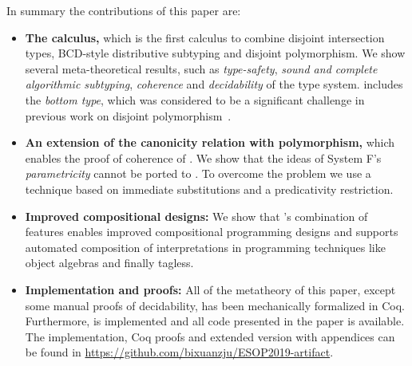 \begin{comment}
Besides coherence, we show
several other important meta-theoretical results, such as type-safety, 
sound and complete algorithmic subtyping, and
decidability of the type system. Remarkably, unlike 
\fsub's \emph{bounded polymorphism}, disjoint polymorphism
in \fnamee supports decidable type-checking.
\end{comment}

In summary the contributions of this paper are:
\begin{itemize}

\item {\bf The \fnamee calculus,} which is the first calculus to combine 
disjoint intersection types, BCD-style distributive subtyping and 
disjoint polymorphism. We show several meta-theoretical results, such as \emph{type-safety}, \emph{sound and complete algorithmic subtyping},
\emph{coherence} and \emph{decidability} of the type system.
\fnamee includes the \emph{bottom type}, which was considered to be a
significant challenge in previous work on disjoint polymorphism~\cite{alpuimdisjoint}.

\item {\bf An extension of the canonicity relation with polymorphism,}
  which enables the proof of coherence of \fnamee. We show that the ideas of
  System F's \emph{parametricity} cannot be ported to
  \fnamee. To overcome the problem we use a technique based on
  immediate substitutions and a predicativity restriction.


\item {\bf Improved compositional designs:} We show that \fnamee's combination of features
enables improved
compositional programming designs and supports automated composition
of interpretations in programming techniques like object algebras and
finally tagless.

\item {\bf Implementation and proofs:} All of the metatheory
  of this paper, except some manual proofs of decidability, has been
  mechanically formalized in Coq. Furthermore, \fnamee is
  implemented and all code presented in the paper is available. The
  implementation, Coq proofs and extended version with appendices can be found in
  \url{https://github.com/bixuanzju/ESOP2019-artifact}.

\end{itemize}


